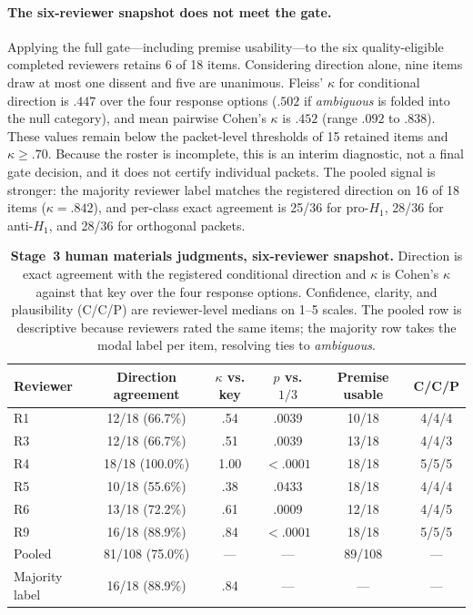\paragraph{The six-reviewer snapshot does not meet the gate.} Applying the full
gate---including premise usability---to the six quality-eligible completed
reviewers retains 6 of 18 items. Considering direction alone, nine items draw at
most one dissent and five are unanimous. Fleiss' $\kappa$ for conditional direction is $.447$ over the four
response options ($.502$ if \emph{ambiguous} is folded into the null category), and
mean pairwise Cohen's $\kappa$ is $.452$ (range $.092$ to $.838$). These values
remain below the packet-level thresholds of 15 retained items and
$\kappa\geq.70$. Because the roster is incomplete, this is an interim diagnostic,
not a final gate decision, and it does not certify individual packets. The pooled
signal is stronger: the majority reviewer label matches the registered direction
on 16 of 18 items ($\kappa=.842$), and per-class exact agreement is 25/36 for
pro-$H_1$, 28/36 for anti-$H_1$, and 28/36 for orthogonal packets.
\begin{table}[t]
\centering
\small
\caption{\textbf{Stage~3 human materials judgments, six-reviewer snapshot.}
Direction is exact agreement with the registered conditional direction and
$\kappa$ is Cohen's $\kappa$ against that key over the four response options.
Confidence, clarity, and plausibility (C/C/P) are reviewer-level medians on 1--5
scales. The pooled row is descriptive because reviewers rated the same items; the
majority row takes the modal label per item, resolving ties to \emph{ambiguous}.}
\label{tab:stage3-human}
\begin{tabular}{lccccc}
\toprule
Reviewer & Direction agreement & $\kappa$ vs. key & $p$ vs. $1/3$ & Premise usable & C/C/P \\
\midrule
R1 & 12/18 (66.7\%) & .54 & .0039 & 10/18 & 4/4/4 \\
R3 & 12/18 (66.7\%) & .51 & .0039 & 13/18 & 4/4/3 \\
R4 & 18/18 (100.0\%) & 1.00 & $<.0001$ & 18/18 & 5/5/5 \\
R5 & 10/18 (55.6\%) & .38 & .0433 & 18/18 & 4/4/4 \\
R6 & 13/18 (72.2\%) & .61 & .0009 & 12/18 & 4/4/5 \\
R9 & 16/18 (88.9\%) & .84 & $<.0001$ & 18/18 & 5/5/5 \\
\midrule
Pooled & 81/108 (75.0\%) & --- & --- & 89/108 & --- \\
Majority label & 16/18 (88.9\%) & .84 & --- & --- & --- \\
\bottomrule
\end{tabular}
\end{table}

